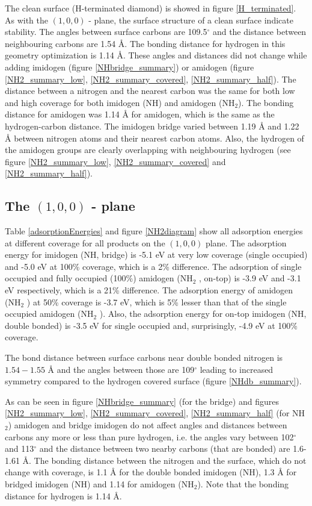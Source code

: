 \documentclass[10pt,a4paper]{article}
\begin{document}
The clean surface (H-terminated diamond) is showed in figure \ref{H_terminated}. As with the $(1,  0,  0)$ - plane, the surface structure of a clean surface indicate stability. The angles between surface carbons are 109.5$^{\circ}$ and the distance between neighbouring carbons are 1.54 Å. The bonding distance for hydrogen in this geometry optimization is 1.14 Å. These angles and distances did not change while adding imidogen (figure \ref{NHbridge_summary}) or amidogen (figure \ref{NH2_summary_low},   \ref{NH2_summary_covered}, \ref{NH2_summary_half}). The distance between a nitrogen and the nearest carbon was the same for both low and high coverage for both imidogen (NH) and amidogen (NH$_2$). The bonding distance for amidogen was 1.14 Å for amidogen, which is the same as the hydrogen-carbon distance. The imidogen bridge varied between 1.19 Å and 1.22 Å between nitrogen atoms and their nearest carbon atoms. Also, the hydrogen of the amidogen groups are clearly overlapping with neighbouring hydrogen (see figure \ref{NH2_summary_low}, \ref{NH2_summary_covered} and \ref{NH2_summary_half}).



\subsection{The $(1,  0,  0)$ - plane}
Table \ref{adsorptionEnergies} and figure \ref{NH2diagram} show all adsorption energies at different coverage for all products on the $(1,  0,  0)$ plane. The adsorption energy for imidogen (NH, bridge) is -5.1 eV at very low coverage (single occupied) and -5.0 eV at 100\% coverage, which is a 2\% difference. The adsorption of single occupied and fully occupied (100\%) amidogen (NH$_2$ , on-top) is -3.9 eV and -3.1 eV respectively, which is a 21\% difference. The adsorption energy of amidogen (NH$_2$ ) at 50\% coverage is -3.7 eV, which is 5\% lesser than that of the single occupied amidogen (NH$_2$ ). Also, the adsorption energy for on-top imidogen (NH, double bonded) is -3.5 eV for single occupied and, surprisingly, -4.9 eV at 100\% coverage. 

The bond distance between surface carbons near double bonded nitrogen is $1.54-1.55$ Å and the angles between those are 109$^{\circ}$ leading to increased symmetry compared to the hydrogen covered surface (figure \ref{NHdb_summary}).

As can be seen in figure \ref{NHbridge_summary} (for the bridge) and figures \ref{NH2_summary_low},   \ref{NH2_summary_covered}, \ref{NH2_summary_half} (for NH$_2$) amidogen and bridge imidogen do not affect angles and distances between carbons  any more or less than pure hydrogen, i.e. the angles vary between 102$^{\circ}$ and 113$^{\circ}$ and the distance between two nearby carbons (that are bonded) are 1.6-1.61 Å.  The bonding distance between the nitrogen and the surface, which do not change with coverage, is 1.1 Å for the double bonded imidogen (NH), 1.3 Å for bridged imidogen (NH) and 1.14 for amidogen (NH$_2$). Note that the bonding distance for hydrogen is 1.14 Å.
\end{document}
